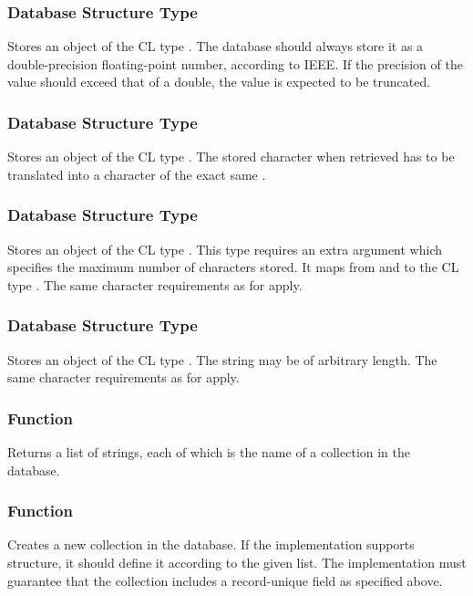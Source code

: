 \subsubsection{Database Structure Type }
Stores an object of the CL type . The database should always store it as a double-precision floating-point number, according to IEEE. If the precision of the value should exceed that of a double, the value is expected to be truncated.

\subsubsection{Database Structure Type }
Stores an object of the CL type . The stored character when retrieved has to be translated into a character of the exact same .

\subsubsection{Database Structure Type }
Stores an object of the CL type . This type requires an extra argument which specifies the maximum number of characters stored. It maps from and to the CL type . The same character requirements as for  apply.

\subsubsection{Database Structure Type }
Stores an object of the CL type . The string may be of arbitrary length. The same character requirements as for  apply.

\subsubsection{Function }
Returns a list of strings, each of which is the name of a collection in the database.

\subsubsection{Function }
Creates a new collection in the database. If the implementation supports structure, it should define it according to the given  list. The implementation must guarantee that the collection includes a record-unique  field as specified above. \\


